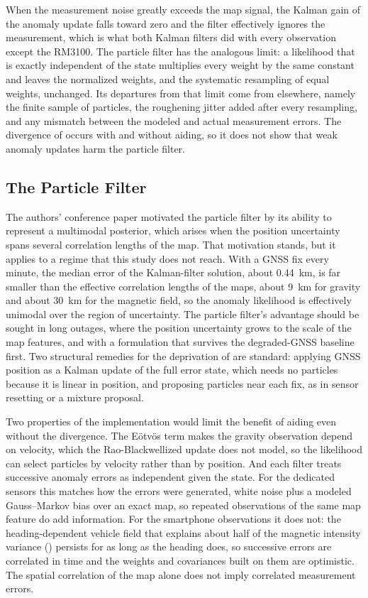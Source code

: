 When the measurement noise greatly exceeds the map signal, the Kalman gain of the anomaly update falls toward zero and the filter effectively ignores the measurement, which is what both Kalman filters did with every observation except the RM3100. The particle filter has the analogous limit: a likelihood that is exactly independent of the state multiplies every weight by the same constant and leaves the normalized weights, and the systematic resampling of equal weights, unchanged. Its departures from that limit come from elsewhere, namely the finite sample of particles, the roughening jitter added after every resampling, and any mismatch between the modeled and actual measurement errors. The divergence of  occurs with and without aiding, so it does not show that weak anomaly updates harm the particle filter.

\subsection{The Particle Filter}

The authors' conference paper motivated the particle filter by its ability to represent a multimodal posterior, which arises when the position uncertainty spans several correlation lengths of the map. That motivation stands, but it applies to a regime that this study does not reach. With a GNSS fix every minute, the median error of the Kalman-filter solution, about 0.44~km, is far smaller than the effective correlation lengths of the maps, about 9~km for gravity and about 30~km for the magnetic field, so the anomaly likelihood is effectively unimodal over the region of uncertainty. The particle filter's advantage should be sought in long outages, where the position uncertainty grows to the scale of the map features, and with a formulation that survives the degraded-GNSS baseline first. Two structural remedies for the deprivation of  are standard: applying GNSS position as a Kalman update of the full error state, which needs no particles because it is linear in position, and proposing particles near each fix, as in sensor resetting or a mixture proposal.

Two properties of the implementation would limit the benefit of aiding even without the divergence. The E\"{o}tv\"{o}s term makes the gravity observation depend on velocity, which the Rao-Blackwellized update does not model, so the likelihood can select particles by velocity rather than by position. And each filter treats successive anomaly errors as independent given the state. For the dedicated sensors this matches how the errors were generated, white noise plus a modeled Gauss--Markov bias over an exact map, so repeated observations of the same map feature do add information. For the smartphone observations it does not: the heading-dependent vehicle field that explains about half of the magnetic intensity variance () persists for as long as the heading does, so successive errors are correlated in time and the weights and covariances built on them are optimistic. The spatial correlation of the map alone does not imply correlated measurement errors.


